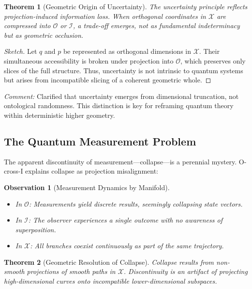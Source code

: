 \documentclass{article}
\newtheorem{theorem}{Theorem}
\newtheorem{observation}{Observation}
\begin{document}
\begin{theorem}[Geometric Origin of Uncertainty]
The uncertainty principle reflects projection-induced information loss. When orthogonal coordinates in $\mathcal{X}$ are compressed into $\mathcal{O}$ or $\mathcal{I}$, a trade-off emerges, not as fundamental indeterminacy but as geometric occlusion.
\end{theorem}

\begin{proof}[Sketch]
Let $q$ and $p$ be represented as orthogonal dimensions in $\mathcal{X}$. Their simultaneous accessibility is broken under projection into $\mathcal{O}$, which preserves only slices of the full structure. Thus, uncertainty is not intrinsic to quantum systems but arises from incompatible slicing of a coherent geometric whole.
\end{proof}

\textit{Comment:} Clarified that uncertainty emerges from dimensional truncation, not ontological randomness. This distinction is key for reframing quantum theory within deterministic higher geometry.

\subsection{The Quantum Measurement Problem}

The apparent discontinuity of measurement—collapse—is a perennial mystery. O-cross-I explains collapse as projection misalignment:

\begin{observation}[Measurement Dynamics by Manifold]\
\begin{itemize}
    \item In $\mathcal{O}$: Measurements yield discrete results, seemingly collapsing state vectors.
    \item In $\mathcal{I}$: The observer experiences a single outcome with no awareness of superposition.
    \item In $\mathcal{X}$: All branches coexist continuously as part of the same trajectory.
\end{itemize}
\end{observation}

\begin{theorem}[Geometric Resolution of Collapse]
Collapse results from non-smooth projections of smooth paths in $\mathcal{X}$. Discontinuity is an artifact of projecting high-dimensional curves onto incompatible lower-dimensional subspaces.
\end{theorem}
\end{document}
